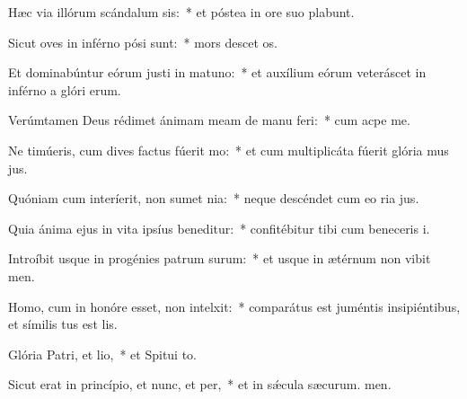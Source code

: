 \item Hæc via illórum scándalum sis:~* et póstea in ore suo plabunt.
\item Sicut oves in inférno pósi sunt:~* mors descet os.
\item Et dominabúntur eórum justi in matuno:~* et auxílium eórum veteráscet in inférno a glóri erum.
\item Verúmtamen Deus rédimet ánimam meam de manu feri:~* cum acpe me.
\item Ne timúeris, cum dives factus fúerit mo:~* et cum multiplicáta fúerit glória mus jus.
\item Quóniam cum interíerit, non sumet nia:~* neque descéndet cum eo ria jus.
\item Quia ánima ejus in vita ipsíus beneditur:~* confitébitur tibi cum beneceris i.
\item Introíbit usque in progénies patrum surum:~* et usque in ætérnum non vibit men.
\item Homo, cum in honóre esset, non intelxit:~* comparátus est juméntis insipiéntibus, et símilis tus est lis.
\item Glória Patri, et lio,~* et Spitui to.
\item Sicut erat in princípio, et nunc, et per,~* et in sǽcula sæcurum. men.
